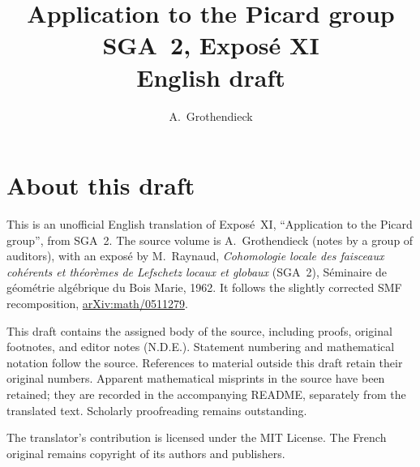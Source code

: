 \documentclass[11pt,a4paper,oneside]{amsbook}
\title[SGA~2, Exposé XI (English draft)]{Application to the Picard group\\
{\normalsize SGA~2, Exposé XI\\English draft}}
\author{A.\ Grothendieck}
\date{}
\begin{document}
\frontmatter
\maketitle

\chapter*{About this draft}
This is an unofficial English translation of Expos\'e~XI, ``Application to the Picard group'',
from SGA~2. The source volume is A.\ Grothendieck
(notes by a group of auditors), with an expos\'e by M.\ Raynaud,
\textit{Cohomologie locale des faisceaux coh\'erents et th\'eor\`emes
de Lefschetz locaux et globaux} (SGA~2), S\'eminaire de g\'eom\'etrie
alg\'ebrique du Bois Marie, 1962. It follows the slightly corrected
SMF recomposition,
\href{https://arxiv.org/abs/math/0511279}{arXiv:math/0511279}.

This draft contains the assigned body of the source, including proofs,
original footnotes, and editor notes (N.D.E.). Statement numbering and
mathematical notation follow the source. References to material outside
this draft retain their original numbers. Apparent mathematical
misprints in the source have been retained; they are recorded in the
accompanying README, separately from the translated text. Scholarly
proofreading remains outstanding.

The translator's contribution is licensed under
the MIT License.
The French original remains copyright of its authors and publishers.

\tableofcontents
\mainmatter
\setcounter{chapter}{10}

\end{document}
